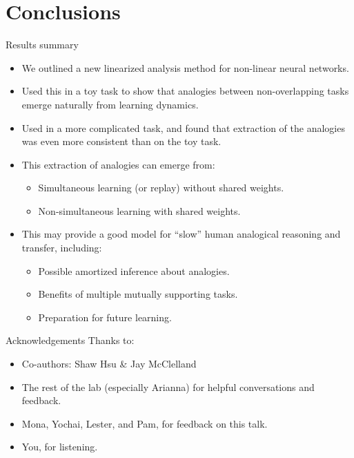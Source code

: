 \documentclass{beamer}
\begin{document}
\section{Conclusions}

\begin{frame}{Results summary}
\begin{itemize}
    \item<1-> We outlined a new linearized analysis method for non-linear neural networks. 
    \item<2-> Used this in a toy task to show that analogies between non-overlapping tasks emerge naturally from learning dynamics. 
    \item<3-> Used in a more complicated task, and found that extraction of the analogies was even more consistent than on the toy task. 
    \item<4-> This extraction of analogies can emerge from:
    \begin{itemize}
	\item<5-> Simultaneous learning (or replay) without shared weights. 
	\item<6-> Non-simultaneous learning with shared weights.
    \end{itemize}
    \item<7-> This may provide a good model for ``slow'' human analogical reasoning and transfer, including:
    \begin{itemize}
	\item<8-> Possible amortized inference about analogies.
	\item<9-> Benefits of multiple mutually supporting tasks.
	\item<10-> Preparation for future learning.
    \end{itemize}
\end{itemize}
\end{frame}

\begin{frame}{Acknowledgements}
Thanks to:
\begin{itemize}
    \item Co-authors: Shaw Hsu \& Jay McClelland
    \item The rest of the lab (especially Arianna) for helpful conversations and feedback. 
    \item Mona, Yochai, Lester, and Pam, for feedback on this talk.
    \item You, for listening.
\end{itemize}
\end{frame}
\end{document}
